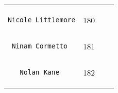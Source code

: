 \documentclass[]{article}
\begin{document}
\begin{longtable}[c]{@{}llll@{}}
\begin{minipage}[t]{0.13\columnwidth}
\end{minipage} & \begin{minipage}[t]{0.15\columnwidth}\raggedright
\end{minipage}
\\\noalign{\medskip}
\begin{minipage}[t]{0.39\columnwidth}\raggedright
\begin{verbatim}
Nicole Littlemore
\end{verbatim}
\end{minipage} & \begin{minipage}[t]{0.10\columnwidth}\raggedright
180
\end{minipage} & \begin{minipage}[t]{0.13\columnwidth}\raggedright
\end{minipage} & \begin{minipage}[t]{0.15\columnwidth}\raggedright
\end{minipage}
\\\noalign{\medskip}
\begin{minipage}[t]{0.39\columnwidth}\raggedright
\begin{verbatim}
 Ninam Cormetto
\end{verbatim}
\end{minipage} & \begin{minipage}[t]{0.10\columnwidth}\raggedright
181
\end{minipage} & \begin{minipage}[t]{0.13\columnwidth}\raggedright
\end{minipage} & \begin{minipage}[t]{0.15\columnwidth}\raggedright
\end{minipage}
\\\noalign{\medskip}
\begin{minipage}[t]{0.39\columnwidth}\raggedright
\begin{verbatim}
   Nolan Kane
\end{verbatim}
\end{minipage} & \begin{minipage}[t]{0.10\columnwidth}\raggedright
182
\end{minipage} & \begin{minipage}[t]{0.13\columnwidth}\raggedright
\end{minipage} & \begin{minipage}[t]{0.15\columnwidth}\raggedright
\end{minipage}
\\\noalign{\medskip}

\end{longtable}
\end{document}
